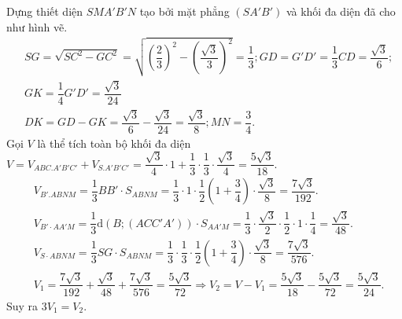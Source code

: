 \begin{ex}
{		Dựng thiết diện $SMA'B'N$ tạo bởi mặt phẳng $\left(SA'B'\right)$ và khối đa diện đã cho như hình vẽ.
		$$
		\begin{aligned}
			& SG=\sqrt{SC^2-GC^2}=\sqrt{\left(\dfrac{2}{3}\right)^2-\left(\dfrac{\sqrt{3}}{3}\right)^2}=\dfrac{1}{3}; GD=G'D'=\dfrac{1}{3} CD=\dfrac{\sqrt{3}}{6}; \\
			& GK=\dfrac{1}{4} G' D'=\dfrac{\sqrt{3}}{24} \\
			& DK=GD-GK=\dfrac{\sqrt{3}}{6}-\dfrac{\sqrt{3}}{24}=\dfrac{\sqrt{3}}{8}; MN=\dfrac{3}{4}.
		\end{aligned}
		$$
		Gọi $V$ là thể tích toàn bộ khối đa diện $V=V_{ABC.A'B'C'}+V_{S.A'B'C'}=\dfrac{\sqrt{3}}{4} \cdot 1+\dfrac{1}{3} \cdot \dfrac{1}{3} \cdot \dfrac{\sqrt{3}}{4}=\dfrac{5 \sqrt{3}}{18}$.
		$$
		\begin{aligned}
			& V_{B'.ABNM}=\dfrac{1}{3} BB' \cdot S_{ABNM}=\dfrac{1}{3} \cdot 1 \cdot \dfrac{1}{2}\left(1+\dfrac{3}{4}\right) \cdot \dfrac{\sqrt{3}}{8}=\dfrac{7 \sqrt{3}}{192}.\\
			& V_{B' \cdot AA'M}=\dfrac{1}{3} \mathrm{d}\left(B;\left(ACC'A'\right)\right) \cdot S_{A A' M}=\dfrac{1}{3} \cdot \dfrac{\sqrt{3}}{2} \cdot \dfrac{1}{2} \cdot 1 \cdot \dfrac{1}{4}=\dfrac{\sqrt{3}}{48}. \\
			& V_{S \cdot A B N M}=\dfrac{1}{3} S G \cdot S_{A B N M}=\dfrac{1}{3} \cdot \dfrac{1}{3} \cdot \dfrac{1}{2}\left(1+\dfrac{3}{4}\right) \cdot \dfrac{\sqrt{3}}{8}=\dfrac{7 \sqrt{3}}{576}. \\
			& V_1=\dfrac{7 \sqrt{3}}{192}+\dfrac{\sqrt{3}}{48}+\dfrac{7 \sqrt{3}}{576}=\dfrac{5 \sqrt{3}}{72}\Rightarrow V_2=V-V_1=\dfrac{5 \sqrt{3}}{18}-\dfrac{5 \sqrt{3}}{72}=\dfrac{5 \sqrt{3}}{24}.
		\end{aligned}
		$$
		Suy ra $3 V_1=V_2$.}
\end{ex}
